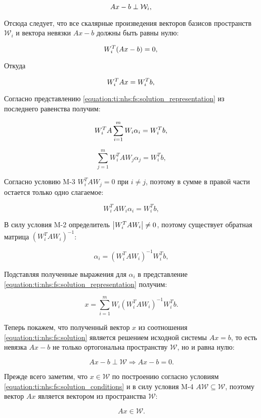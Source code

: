 $$
	Ax - b \perp \mathcal W_i, \\
$$

Отсюда следует, что все скалярные произведения векторов базисов пространств $\mathcal W_i$ и вектора невязки $Ax-b$ должны быть равны нулю:

$$
	W_i^T ( Ax - b ) = 0, \\
$$

Откуда

$$
	W_i^T Ax = W_i^T b, \\
$$

Согласно представлению \ref{equation:ti:nhs:fs:solution_representation} из последнего равенства получим:

$$
	W_i^T A \sum_{i=1}^m W_i \alpha_i = W_i^T b, \\
$$

$$
	\sum_{j=1}^m W_i^T A W_j \alpha_j = W_i^T b,
$$

Согласно условию M-3 $W_i^T A W_j = 0$ при $i \neq j$, поэтому в сумме в правой части остается только одно слагаемое:

$$
	W_i^T A W_i \alpha_i = W_i^T b,
$$

В силу условия M-2 определитель $\left | W_i^T A W_i \right | \neq 0$, поэтому существует обратная матрица
$ \left ( W_i^T A W_i \right ) ^{-1} $:

$$
	\alpha_i = \left ( W_i^T A W_i \right ) ^{-1} W_i^T b,
$$

Подставляя полученные выражения для $\alpha_i$ в представление \ref{equation:ti:nhs:fs:solution_representation} получим:

\begin{equation} \label{equation:ti:nhs:fs:solution}
	x = \sum_{i=1}^m W_i \left ( W_i^T A W_i \right ) ^{-1} W_i^T b.
\end{equation}

Теперь покажем, что полученный вектор $x$ из соотношения \ref{equation:ti:nhs:fs:solution} является решением исходной системы $Ax = b$,
то есть невязка $Ax - b$ не только ортогональна пространству $\mathcal W$, но и равна нулю:

$$
	Ax - b \perp \mathcal W \Rightarrow Ax - b = 0.
$$

Прежде всего заметим, что $x \in \mathcal W$ по построению согласно условиям \ref{equation:ti:nhs:fs:solution_conditions} и в силу условия
M-4 $A \mathcal W \subseteq \mathcal W$, поэтому вектор $Ax$ является вектором из пространства $\mathcal W$:

$$
	Ax \in \mathcal W.
$$

